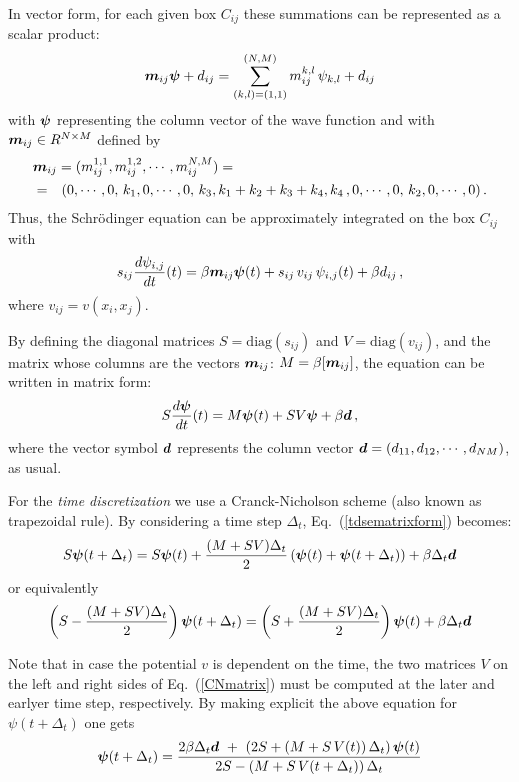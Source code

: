 \documentclass[a4paper,11pt]{article}
\newcommand{\ve}[1]{\mbox{\boldmath $ #1$}}
\begin{document}
In vector form, for each given box $C_{ij}$ these summations can be represented as a scalar product:
\begin{equation}
\ve m_{ij} \ve \psi + d_{ij} = \sum_{(k,l)=(1,1)}^{(N,M)} m_{ij}^{k,l} \, \psi_{k,l} + d_{ij}
\end{equation}
with $\ve \psi$ representing the column vector of the wave function and
with $\ve m_{ij} \in R^{N \times M}$ defined by
\begin{eqnarray}
\lefteqn{ \ve m_{ij} = (m_{ij}^{1,1}, m_{ij}^{1,2},\cdots, m_{ij}^{N,M}) = }  \\ \nonumber
&=&(0,\cdots, 0, \, k_1, 0, \cdots, 0, \, k_3, k_1+k_2+k_3+k_4, k_4 \, , 0,\cdots, 0, \, k_2, 0, \cdots, 0) \, .
\end{eqnarray}
Thus, the Schr\"{o}dinger equation can be approximately integrated on the box $C_{ij}$ with
\begin{equation}
s_{ij} \frac{d \psi_{i,j}}{dt}(t) = 
\beta \ve m_{ij} \ve \psi(t) + s_{ij} \, v_{ij} \, \psi_{i,j}(t) + \beta d_{ij} \, ,
\end{equation}
where $v_{ij}=v(x_i,x_j)$. 

By defining the diagonal matrices $S = \mbox{diag}(s_{ij})$ and $V = \mbox{diag}(v_{ij})$,
and the matrix whose columns are the vectors $\ve m_{ij}$: $M = \beta [\ve m_{ij}]$,
the equation can be written in matrix form:
\begin{equation} \label{tdsematrixform}
S \frac{d \ve \psi}{dt}(t) = M \ve \psi(t) + S V \ve \psi + \beta \ve d \, ,
\end{equation}
where the vector symbol $\ve d$ represents the column vector
$\ve d = (d_{11}, d_{12},\cdots, d_{NM})$, as usual.

For the \emph{time discretization} we use a Cranck-Nicholson scheme (also known as
trapezoidal rule).  By considering a time step $\Delta_t$, Eq.~(\ref{tdsematrixform}) becomes:
\begin{equation}
S {\ve \psi}(t+\Delta_t) = S \ve \psi(t) + \frac{(M+SV)\Delta_t}{2} 
\left( \ve \psi(t) + \ve \psi(t+\Delta_t) \right) + \beta \Delta_t \ve d
\end{equation}
or equivalently
\begin{equation} \label{CNmatrix}
\left( S - \frac{(M+SV)\Delta_t}{2} \right) \ve \psi(t+\Delta_t) =
\left( S + \frac{(M+SV)\Delta_t}{2} \right) \ve \psi(t) + \beta \Delta_t \ve d
\end{equation}

Note that in case the potential $v$ is dependent on the time, the two matrices $V$ on
the left and right sides of Eq.~(\ref{CNmatrix}) must be computed at the later and earlyer
time step, respectively.
By making explicit the above equation for $\psi(t+\Delta_t)$ one gets
\begin{equation}
\ve \psi(t+\Delta_t) =
\frac{ 2\beta \Delta_t \ve d \ + \ \left(2S + \left( M+S\,V(t) \right)\Delta_t\right) \ve \psi(t) }
{2S - \left( M+S\,V(t+\Delta_t)\right)\Delta_t}
\end{equation}
\end{document}
